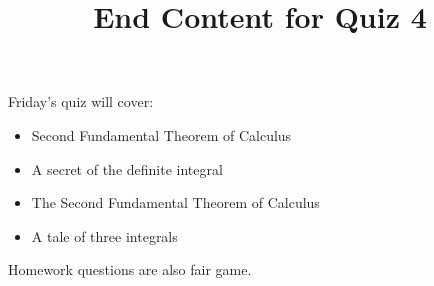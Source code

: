 \documentclass{ximera}
\title{End Content for Quiz 4}
\begin{document}
\begin{abstract}
\end{abstract}

\maketitle

\begin{sectionOutcomes}

Friday's quiz will cover:






\begin{itemize}
\item Second Fundamental Theorem of Calculus
\item A secret of the definite integral
\item The Second Fundamental Theorem of Calculus
\item A tale of three integrals
\end{itemize}

Homework questions are also fair game.

\end{sectionOutcomes}
\end{document}
